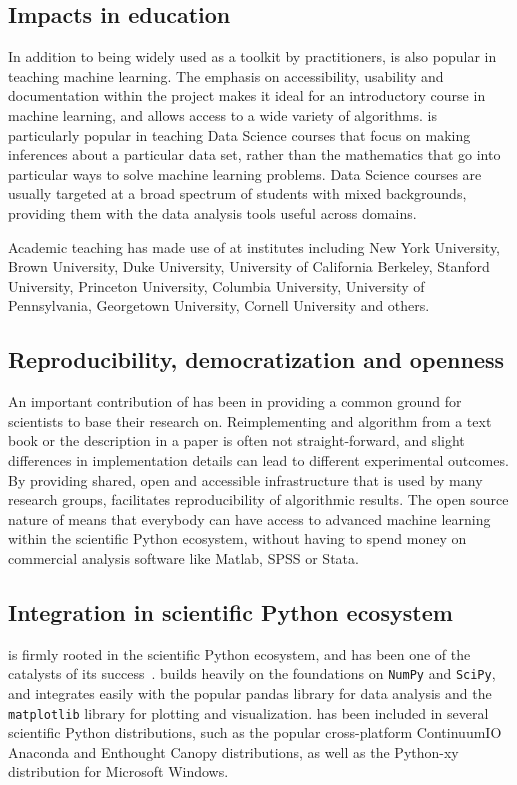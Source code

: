 \subsection{Impacts in education}
In addition to being widely used as a toolkit by practitioners,
\sklearn{} is also popular in teaching machine learning.
The emphasis on accessibility, usability and documentation within
the \sklearn{} project makes it ideal for an introductory
course in machine learning, and allows access to a wide variety
of algorithms. \sklearn{} is particularly popular in teaching
Data Science courses that focus on making inferences about
a particular data set, rather than the mathematics that go into
particular ways to solve machine learning problems.
Data Science courses are usually targeted at a broad spectrum
of students with mixed backgrounds, providing them
with the data analysis tools useful across domains.

Academic teaching has made use of \sklearn{} at institutes including New York
University, Brown University, Duke University, University of California
Berkeley, Stanford University, Princeton University, Columbia University,
University of Pennsylvania, Georgetown University, Cornell University and
others.

\subsection{Reproducibility, democratization and openness}
An important contribution of \sklearn{} has been in providing a common
ground for scientists to base their research on. Reimplementing
and algorithm from a text book or the description in a paper is often not
straight-forward, and slight differences in implementation details can
lead to different experimental outcomes. By providing shared, open and 
accessible infrastructure that is used by many research groups,
\sklearn{} facilitates reproducibility of algorithmic results.
The open source nature of \sklearn{} means that everybody can have access
to advanced machine learning within the scientific Python ecosystem,
without having to spend money on commercial analysis software like Matlab,
SPSS or Stata.

\subsection{Integration in scientific Python ecosystem}
\sklearn{} is firmly rooted in the scientific Python ecosystem, and has been
one of the catalysts of its success~\autocite{benlorica, infoworld}. \sklearn{}
builds heavily on the foundations on \texttt{NumPy} and \texttt{SciPy}, and
integrates easily with the popular pandas library for data analysis and the
\texttt{matplotlib} library for plotting and visualization.
\sklearn{} has been included in several scientific Python distributions, such
as the popular cross-platform ContinuumIO Anaconda and Enthought Canopy
distributions, as well as the Python-xy distribution for Microsoft Windows.

